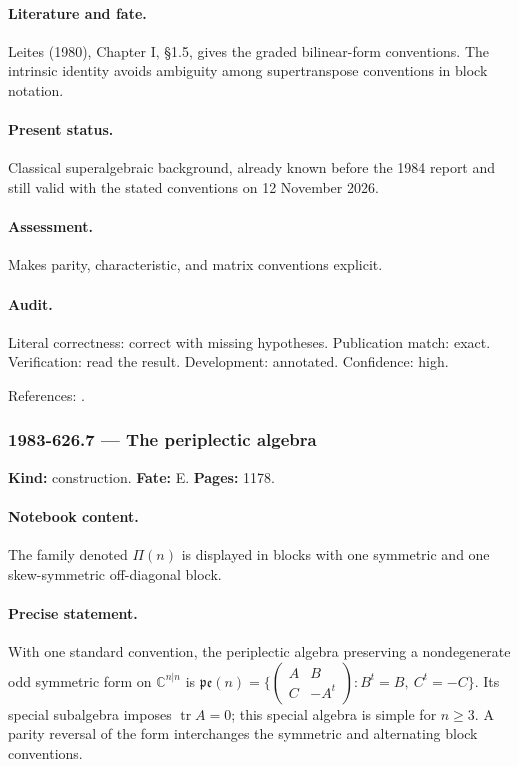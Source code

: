 \paragraph{Literature and fate.} Leites (1980), Chapter I, \S1.5, gives the graded bilinear-form conventions. The intrinsic identity avoids ambiguity among supertranspose conventions in block notation.

\paragraph{Present status.} Classical superalgebraic background, already known before the 1984 report and still valid with the stated conventions on 12 November 2026.

\paragraph{Assessment.} Makes parity, characteristic, and matrix conventions explicit.

\paragraph{Audit.} Literal correctness: correct with missing hypotheses. Publication match: exact. Verification: read the result. Development: annotated. Confidence: high.

\noindent References: \citep{leites1980introduction}.\par

\subsubsection{1983-626.7 --- The periplectic algebra}

\label{item:1983-626.7}

\noindent\textbf{Kind:} construction. \textbf{Fate:} E. \textbf{Pages:} 1178.\par

\paragraph{Notebook content.} The family denoted \(\Pi(n)\) is displayed in blocks with one symmetric and one skew-symmetric off-diagonal block.

\paragraph{Precise statement.} With one standard convention, the periplectic algebra preserving a nondegenerate odd symmetric form on \(\mathbb C^{n|n}\) is \(\mathfrak{pe}(n)=\{\begin{pmatrix}A&B\\C&-A^{t}\end{pmatrix}:B^{t}=B,\ C^{t}=-C\}\). Its special subalgebra imposes \(\operatorname{tr}A=0\); this special algebra is simple for \(n\ge3\). A parity reversal of the form interchanges the symmetric and alternating block conventions.

